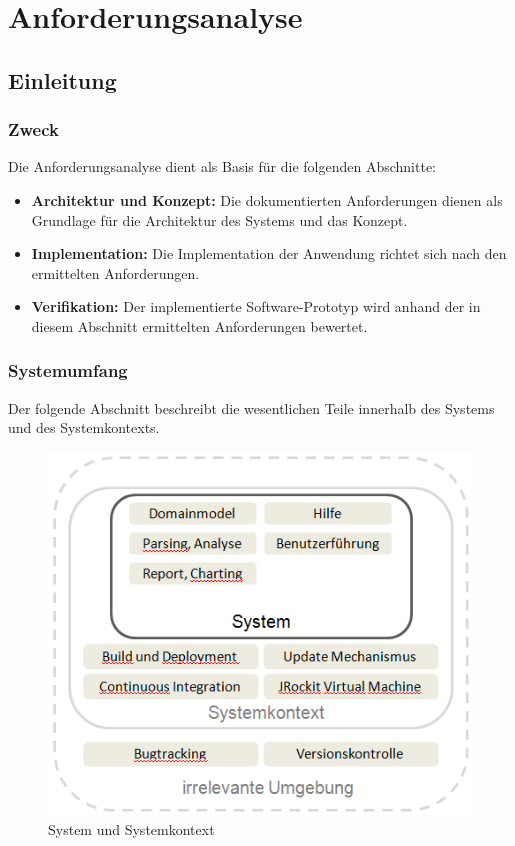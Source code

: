 \chapter{Anforderungsanalyse}\label{anforderungsanalyse}
\section{Einleitung}
\subsection{Zweck}
Die Anforderungsanalyse dient als Basis für die folgenden Abschnitte:

\begin{itemize}
	\item \textbf{Architektur und Konzept:}  Die dokumentierten Anforderungen dienen als Grundlage für die Architektur des Systems und das Konzept. 
	\item \textbf{Implementation:} Die Implementation der Anwendung richtet sich nach den ermittelten Anforderungen. 
	\item \textbf{Verifikation:} Der implementierte Software-Prototyp wird anhand der in diesem Abschnitt ermittelten Anforderungen bewertet. 
\end{itemize}

\subsection{Systemumfang}
Der folgende Abschnitt beschreibt die wesentlichen Teile innerhalb des Systems und des Systemkontexts. 
 \begin{figure}[H]
  	\centering
    	\includegraphics{images/systemumfang}
        	\caption{System und Systemkontext}
\end{figure}
